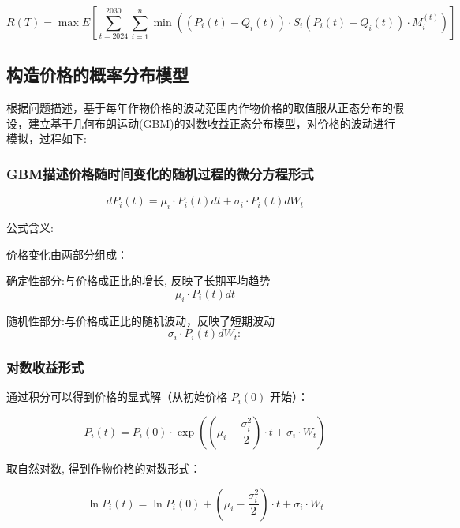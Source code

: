 \documentclass[12pt]{ctexart}
\begin{document}
	\begin{equation}
	R(T)=\max E\left[\sum_{t=2024}^{2030} \sum_{i=1}^n \min \left(\left(P_i(t)-Q_i(t)\right) \cdot S_i\left(P_i(t)-Q_i(t)\right) \cdot M_i^{(t)}\right)\right]
	\end{equation}
	
	\subsection{构造价格的概率分布模型}
	根据问题描述，基于每年作物价格的波动范围内作物价格的取值服从正态分布的假设，建立基于几何布朗运动(GBM)的对数收益正态分布模型，对价格的波动进行模拟，过程如下:
	\subsubsection{GBM描述价格随时间变化的随机过程的微分方程形式}
	
	\begin{equation}
	d P_i(t)=\mu_i \cdot P_i(t) d t+\sigma_i \cdot P_i(t) d W_t
	\end{equation}
	
	
	公式含义:
	
	价格变化由两部分组成：
	
	确定性部分:与价格成正比的增长, 反映了长期平均趋势
	\begin{equation*}\mu_i \cdot P_i(t) d t\end{equation*} 
	
	
	随机性部分:与价格成正比的随机波动，反映了短期波动
	\begin{equation*}\sigma_i \cdot P_i(t) d W_t:\end{equation*} 
	
	\subsubsection{对数收益形式}
	通过积分可以得到价格的显式解（从初始价格 $P_i(0)$ 开始）：
	
	\begin{equation}
	P_i(t)=P_i(0) \cdot \exp \left(\left(\mu_i-\frac{\sigma_i^2}{2}\right) \cdot t+\sigma_i \cdot W_t\right)
	\end{equation}
	
	
	取自然对数, 得到作物价格的对数形式：
	
	\begin{equation}
	\ln P_i(t)=\ln P_i(0)+\left(\mu_i-\frac{\sigma_i^2}{2}\right) \cdot t+\sigma_i \cdot W_t
\end{equation}
	
\end{document}
